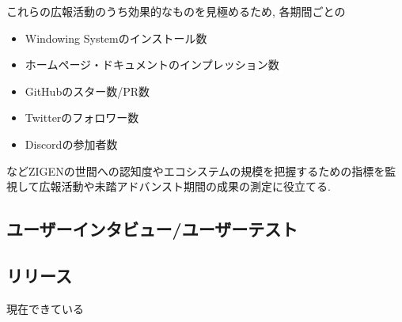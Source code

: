 これらの広報活動のうち効果的なものを見極めるため, 各期間ごとの
\begin{itemize}
  \item Windowing Systemのインストール数
  \item ホームページ・ドキュメントのインプレッション数
  \item GitHubのスター数/PR数
  \item Twitterのフォロワー数
  \item Discordの参加者数
\end{itemize}
などZIGENの世間への認知度やエコシステムの規模を把握するための指標を監視して広報活動や未踏アドバンスト期間の成果の測定に役立てる.

\subsection{ユーザーインタビュー/ユーザーテスト}

\subsection{リリース}
現在できている
